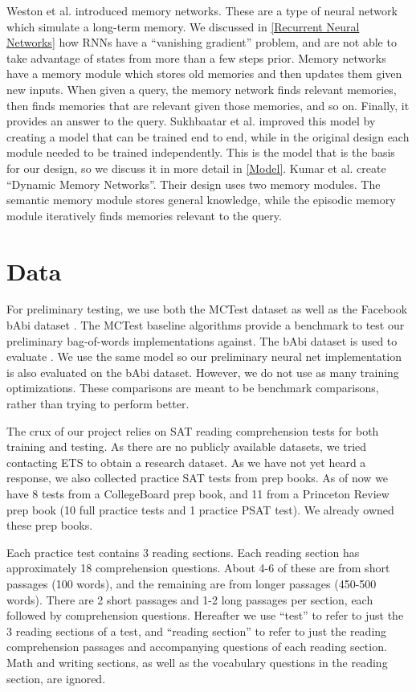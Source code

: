\documentclass[pageno]{jpaper}
\begin{document}
Weston et al.\cite{Weston2015a} introduced memory networks. These are a type of
neural network which simulate a long-term memory. We discussed in \ref{Recurrent
Neural Networks} how RNNs have a ``vanishing gradient'' problem, and are not
able to take advantage of states from more than a few steps prior. Memory
networks have a memory module which stores old memories and then updates them
given new inputs. When given a query, the memory network finds relevant
memories, then finds memories that are relevant given those memories, and so on.
Finally, it provides an answer to the query. Sukhbaatar et
al.\cite{Sukhbaatar2015} improved this model by creating a model that can be
trained end to end, while in the original design each module needed to be
trained independently. This is the model that is the basis for our design, so we
discuss it in more detail in \ref{Model}. Kumar et al.\cite{Kumar2015} create
``Dynamic Memory Networks''. Their design uses two memory modules. The semantic
memory module stores general knowledge, while the episodic memory module
iteratively finds memories relevant to the query.

\section{Data}
\label{Data}

For preliminary testing, we use both the MCTest \cite{Richardson2013} dataset as
well as the Facebook bAbi dataset \cite{Weston2015}. The MCTest baseline
algorithms provide a benchmark to test our preliminary bag-of-words
implementations against. The bAbi dataset is used to evaluate
\cite{Sukhbaatar2015}. We use the same model so our preliminary neural net
implementation is also evaluated on the bAbi dataset. However, we do not use as
many training optimizations. These comparisons are meant to be benchmark
comparisons, rather than trying to perform better.

The crux of our project relies on SAT reading comprehension tests for both
training and testing. As there are no publicly available datasets, we tried
contacting ETS to obtain a research dataset. As we have not yet heard a response,
we also collected practice SAT tests from prep books. As of now we have 8 tests
from a CollegeBoard prep book, and 11 from a Princeton Review prep book (10 full
practice tests and 1 practice PSAT test). We already owned these prep books.

Each practice test contains 3 reading sections. Each reading section has
approximately 18 comprehension questions. About 4-6 of these are from short
passages (100 words), and the remaining are from longer passages (450-500
words). There are 2 short passages and 1-2 long passages per section, each
followed by comprehension questions. Hereafter we use ``test'' to refer to just
the 3 reading sections of a test, and ``reading section'' to refer to just the
reading comprehension passages and accompanying questions of each reading
section. Math and writing sections, as well as the vocabulary questions in the
reading section, are ignored.
\end{document}
